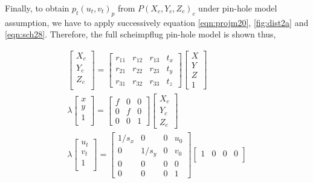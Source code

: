 \documentclass[12pt]{article}
\begin{document}
Finally, to obtain $p_t(u_t,v_t)_p$ from $P(X_c,Y_c,Z_c)_c$ under pin-hole model assumption, we have to apply successively equation \ref{eqn:projm20}, \ref{fig:dist2a} and \ref{eqn:sch28}. Therefore, the full scheimpflug pin-hole model is shown thus,

\begin{equation}  
\begin{split}
\begin{bmatrix}
X_c\\
Y_c\\
Z_c\\
\end{bmatrix} =\begin{bmatrix}
r_{11}& r_{12} & r_{13}&t_x \\
r_{21}& r_{22} & r_{23}&t_y \\
r_{31}& r_{32} & r_{33}&t_z
\end{bmatrix}  \begin{bmatrix}
X\\
Y\\
Z\\
1
\end{bmatrix}\\
\lambda\begin{bmatrix}
x\\
y\\
1\\
\end{bmatrix} =\begin{bmatrix}
f& 0 & 0 \\
0& f & 0 \\
0& 0 & 1
\end{bmatrix}  \begin{bmatrix}
X_c\\
Y_c\\
Z_c
\end{bmatrix}\\
\lambda\begin{bmatrix}
u_t\\
v_t\\
1\\
\end{bmatrix} =\begin{bmatrix}
1/s_x & 0 & 0&u_{0} \\
0 & 1/s_y & 0& v_{0} \\
0 & 0 & 0&0 \\
0& 0 & 0 & 1 
\end{bmatrix}\begin{bmatrix}
1& 0 & 0&0 \\

\end{bmatrix}
\end{split}
\end{equation}
\end{document}

